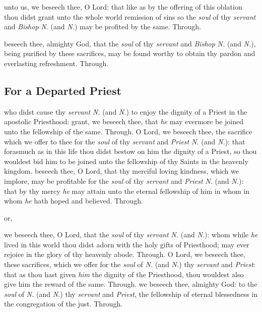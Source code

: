 \begin{multicols}{2}
\secret
{} unto us, we beseech thee, O Lord: that like as by the offering of this oblation thou didst grant unto the whole world remission of sins so the \textit{soul} of thy \textit{servant} and \textit{Bishop} \textit{N.} (and \textit{N.}) may be profited by the same. Through.

\postcommunion
{} beseech thee, almighty God, that the \textit{soul} of thy \textit{servant} and \textit{Bishop} \textit{N.} (and \textit{N.}), being purified by these sacrifices, may be found worthy to obtain thy pardon and everlasting refreshment. Through.

   \newcolumn

\subsection{For a Departed Priest}
\collect
{} who didst cause thy \textit{servant} \textit{N.} (and \textit{N.}) to enjoy the dignity of a Priest in the apostolic Priesthood: grant, we beseech thee, that \textit{he} may evermore be joined unto the fellowship of the same. Through.
\secret
{} O Lord, we beseech thee, the sacrifice which we offer to thee for the \textit{soul} of thy \textit{servant} and \textit{Priest} \textit{N.} (and \textit{N.}): that forasmuch as in this life thou didst bestow on him the dignity of a Priest, so thou wouldest bid him to be joined unto the fellowship of thy Saints in the heavenly kingdom.
\postcommunion
{} beseech thee, O Lord, that thy merciful loving kindness, which we implore, may be profitable for the \textit{soul} of thy \textit{servant} and \textit{Priest} \textit{N.} (and \textit{N.}): that by thy mercy \textit{he} may attain unto the eternal fellowship of him in whom in whom \textit{he} hath hoped and believed. Through.
\begin{inhead}
    or,
\end{inhead}
\vspace{-1\baselineskip}
\collect
{} we beseech thee, O Lord, that the \textit{soul} of thy \textit{servant} \textit{N.} (and \textit{N.}): whom while \textit{he} lived in this world thou didst adorn with the holy gifts of Priesthood; may ever rejoice in the glory of thy heavenly abode. Through.
\secret
{} O Lord, we beseech thee, these sacrifices, which we offer for the \textit{soul} of \textit{N.} (and \textit{N.}) thy \textit{servant} and \textit{Priest}: that as thou hast given \textit{him} the dignity of the Priesthood, thou wouldest also give him the reward of the same. Through.
\postcommunion
{} we beseech thee, almighty God: to the \textit{soul} of \textit{N.} (and \textit{N.}) thy \textit{servant} and \textit{Priest}, the fellowship of eternal blessedness in the congregation of the just. Through.


\end{multicols}
